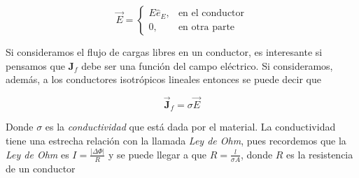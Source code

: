 \begin{equation}
    \vec{E} = \begin{cases}
        E\hat{e}_E, &  \text{en el conductor} \\
        0, & \text{en otra parte}
    \end{cases}
\end{equation}

Si consideramos el flujo de cargas libres en un conductor, es interesante si pensamos que $\textbf{J}_f$ debe ser una función del campo eléctrico. Si consideramos, además, a los conductores isotrópicos lineales entonces se puede decir que 

\begin{equation}
    \vec{\textbf{J}}_f = \sigma \vec{E}
\end{equation}

Donde $\sigma$ es la \emph{conductividad} que está dada por el material. La conductividad tiene una estrecha relación con la llamada \emph{Ley de Ohm}, pues recordemos que la \emph{Ley de Ohm} es $I = \frac{\left| {\Delta \Phi} \right|}{R}$ y se puede llegar a que $R = \frac{l}{\sigma A}$, donde $R$ es la resistencia de un conductor

